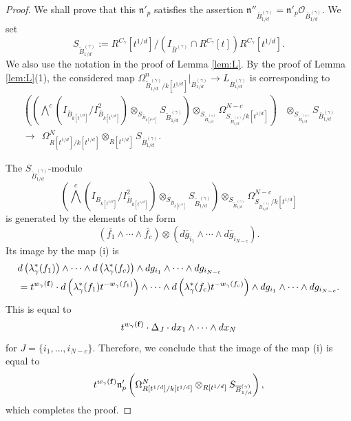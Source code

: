 \documentclass[a4paper,11pt]{amsart}
\theoremstyle{definition}
\theoremstyle{remark}
\begin{document}
\begin{proof}
We shall prove that this $\mathfrak{n}'_{p}$ satisfies the assertion $\mathfrak{n}''_{\overline{B}^{(\gamma)}_{1/d}} = \mathfrak{n}'_{p} \mathcal{O}_{\overline{B}^{(\gamma)}_{1/d}}$.  
We set 
\[
S_{\widetilde{B}^{(\gamma)}_{1/d}} := R^{C_{\gamma}}[t^{1/d}] \big/ \left(  I_{\overline{B}^{(\gamma)}} \cap R^{C_{\gamma}}[t] \right) R^{C_{\gamma}}[t^{1/d}]. 
\]
We also use the notation in the proof of Lemma \ref{lem:L}. 
By the proof of Lemma \ref{lem:L}(1), the considered map $\Omega^n _{\widetilde{B}^{(\gamma)}_{1/d}/k[t^{1/d}]} \big|_{\overline{B}^{(\gamma)}_{1/d}} \to L_{\overline{B}^{(\gamma)}_{1/d}}$ is corresponding to 
\begin{align*}
\tag{i}
\left ( \left( \bigwedge ^{c} \left( I_{\overline{B}_{k[t^{1/d}]}}/ I^2_{\overline{B}_{k[t^{1/d}]}} \right) \otimes _{S_{\overline{B}_{k[t^{1/d}]}}} S_{\widetilde{B}^{(\gamma)}_{1/d}} \right)  \otimes _{S_{\widetilde{B}^{(\gamma)}_{1/d}}} \Omega _{S_{\widetilde{B}^{(\gamma)}_{1/d}}/k[t^{1/d}]} ^{N-c} \right) &
\otimes _{S_{\widetilde{B}^{(\gamma)}_{1/d}}} S_{\overline{B}^{(\gamma)}_{1/d}} \\
\longrightarrow \ \ \Omega _{R[t^{1/d}]/k[t^{1/d}]} ^N \otimes _{R[t^{1/d}]} S_{\overline{B}^{(\gamma)}_{1/d}}. & 
\end{align*}

The
$S_{\widetilde{B}^{(\gamma)}_{1/d}}$-module 
\[
\left( \bigwedge ^{c} \left( I_{\overline{B}_{k[t^{1/d}]}}/ I^2_{\overline{B}_{k[t^{1/d}]}} \right) \otimes _{S_{\overline{B}_{k[t^{1/d}]}}} S_{\widetilde{B}^{(\gamma)}_{1/d}} \right) \otimes _{S_{\widetilde{B}^{(\gamma)}_{1/d}}} \Omega _{S_{\widetilde{B}^{(\gamma)}_{1/d}}/k[t^{1/d}]} ^{N-c}
\] is generated by the elements of the form 
\[
\left( \overline{f_1} \wedge \cdots \wedge \overline{f_c} \right) \otimes \left( d \overline{g}_{i_1} \wedge \cdots \wedge d \overline{g}_{i_{N-c}} \right).  
\]
Its image by the map (i) is
\begin{align*}
&d \left( \lambda _{\gamma} ^* (f_1) \right) \wedge \cdots \wedge d \left( \lambda _{\gamma} ^* (f_c) \right) \wedge  dg_{i _1} \wedge \cdots \wedge dg_{i_{N-c}} \\
&=t^{w_{\gamma}({\bf f})} \cdot d \left( \lambda _{\gamma} ^* (f_1) t^{- w_{\gamma} (f_1)} \right) \wedge \cdots \wedge d \left( \lambda _{\gamma} ^* (f_c) t^{- w_{\gamma} (f_c)} \right) \wedge  d g_{i _1} \wedge \cdots \wedge d g_{i_{N-c}}. 
\end{align*}
This is equal to 
\[
t^{w_{\gamma}({\bf f})} \cdot \Delta _J \cdot dx_1 \wedge \cdots \wedge dx_N
\]
for $J = \{ i_1, \ldots , i_{N-c} \}$. 
Therefore, we conclude that the image of the map (i) is equal to 
\[
t^{w_\gamma({\bf f})} \mathfrak{n}'_{p} \left( \Omega _{R[t^{1/d}]/k[t^{1/d}]} ^N \otimes _{R[t^{1/d}]} S_{\overline{B}^{(\gamma)}_{1/d}} \right), 
\]
which completes the proof. 
\end{proof}
\end{document}
